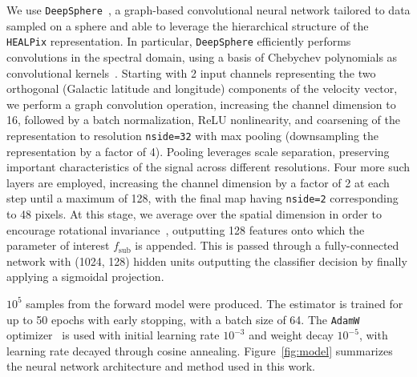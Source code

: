 \documentclass[preprint]{article}
\begin{document}
We use \texttt{DeepSphere}~\cite{defferrard2020deepsphere,Perraudin:2018rbt}, a graph-based convolutional neural network tailored to data sampled on a sphere and able to leverage the hierarchical structure of the \texttt{HEALPix} representation. In particular, \texttt{DeepSphere} efficiently performs convolutions in the spectral domain, using a basis of Chebychev polynomials as convolutional kernels~\cite{defferrard2016convolutional}. Starting with 2 input channels representing the two orthogonal (Galactic latitude and longitude) components of the velocity vector, we perform a graph convolution operation, increasing the channel dimension to 16, followed by a batch normalization, ReLU nonlinearity, and coarsening of the representation to resolution \texttt{nside=32} with max pooling (downsampling the representation by a factor of 4). 
Pooling leverages scale separation, preserving important characteristics of the signal across different resolutions. 
Four more such layers are employed, increasing the channel dimension by a factor of 2 at each step until a maximum of 128, with the final map having \texttt{nside=2} corresponding to 48 pixels. At this stage, we average over the spatial dimension in order to encourage rotational invariance~\cite{lin2014network}, outputting 128 features onto which the parameter of interest $f_\mathrm{sub}$ is appended. This is passed through a fully-connected network with (1024, 128) hidden units outputting the classifier decision by finally applying a sigmoidal projection.  %

\bigskip

$10^5$ samples from the forward model were produced. The estimator is trained for up to 50 epochs with early stopping, with a batch size of 64. The \texttt{AdamW} optimizer~\cite{kingma2017adam,loshchilov2019decoupled} is used with initial learning rate $10^{-3}$ and weight decay $10^{-5}$, with learning rate decayed through cosine annealing. Figure~\ref{fig:model} summarizes the neural network architecture and method used in this work.

\end{document}
